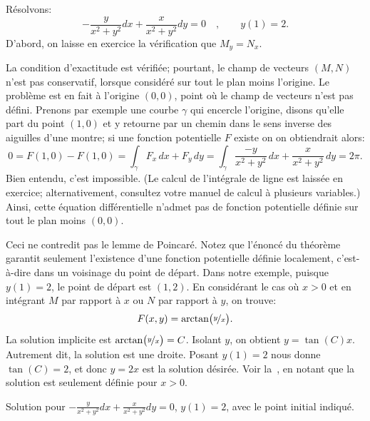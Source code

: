 \begin{example}
	Résolvons:
	\begin{equation*}
		-\frac{y}{x^2+y^2} dx + \frac{x}{x^2+y^2} dy = 0 \quad , \qquad y(1) = 2.
	\end{equation*}
	D'abord, on laisse en exercice la vérification que 	$M_y = N_x$.

	La condition d'exactitude est vérifiée; pourtant, le champ de vecteurs $(M,N)$ n'est pas conservatif,
	lorsque considéré sur tout le plan moins l'origine.
	Le problème est en fait à l'origine $(0,0)$, point où le champ de vecteurs n'est pas défini.
	Prenons par exemple une courbe $\gamma$ qui encercle l'origine, disons qu'elle part du point $(1,0)$
	et y retourne par un chemin dans le sens inverse des aiguilles d'une montre;
	si une fonction potentielle $F$ existe on on obtiendrait alors:
	\begin{equation*}
		0 = F(1,0) - F(1,0) = \int_\gamma F_x \, dx + F_y \, dy
							= \int_\gamma \frac{-y}{x^2+y^2} \, dx + \frac{x}{x^2+y^2} \, dy = 2\pi .
	\end{equation*}
	Bien entendu, c'est impossible.  (Le calcul de l'intégrale de ligne est laissée en exercice;
	alternativement, consultez votre manuel de calcul à plusieurs variables.)
	Ainsi, cette équation différentielle n'admet pas de fonction potentielle définie sur tout le plan moins $(0,0)$.

	Ceci ne contredit pas le lemme de Poincaré.
	Notez que l'énoncé du théorème garantit seulement l'existence d'une fonction potentielle définie localement,
	c'est-à-dire dans un voisinage du point de départ.   Dans notre exemple, puisque $y(1) = 2$, le point de départ est $(1,2)$.
	En considérant le cas où $x > 0$ et en intégrant $M$ par rapport à $x$ ou $N$ par rapport à $y$, on trouve:
	\begin{equation*}
		F(x,y) = \operatorname{arctan} \bigl( \nicefrac{y}{x} \bigr) .
	\end{equation*}
	La solution implicite est
	$\operatorname{arctan} \bigl( \nicefrac{y}{x} \bigr) = C$.  Isolant $y$, on obtient
	$y = \tan(C) x$.  Autrement dit, la solution est une droite.  Posant $y(1) =
	2$ nous donne $\tan(C) = 2$, et donc $y= 2x$ est la solution désirée.
	Voir la~, en notant que la solution est seulement définie pour $x >
	0$.
	\begin{myfig}
		\capstart	{}
		\caption{Solution pour
		$-\frac{y}{x^2+y^2} dx + \frac{x}{x^2+y^2} dy = 0$, $y(1) = 2$,
		avec le point initial indiqué.\label{exact:y2x}}
	\end{myfig}
\end{example}

